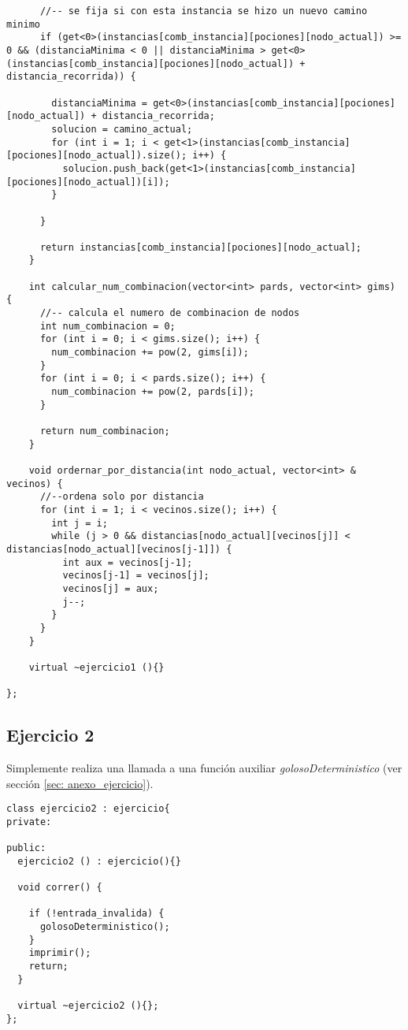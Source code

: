\begin{lstlisting}
      //-- se fija si con esta instancia se hizo un nuevo camino minimo
      if (get<0>(instancias[comb_instancia][pociones][nodo_actual]) >= 0 && (distanciaMinima < 0 || distanciaMinima > get<0>(instancias[comb_instancia][pociones][nodo_actual]) + distancia_recorrida)) {

        distanciaMinima = get<0>(instancias[comb_instancia][pociones][nodo_actual]) + distancia_recorrida;
        solucion = camino_actual;
        for (int i = 1; i < get<1>(instancias[comb_instancia][pociones][nodo_actual]).size(); i++) {
          solucion.push_back(get<1>(instancias[comb_instancia][pociones][nodo_actual])[i]);
        }

      }

      return instancias[comb_instancia][pociones][nodo_actual];
    }

    int calcular_num_combinacion(vector<int> pards, vector<int> gims) {
      //-- calcula el numero de combinacion de nodos
      int num_combinacion = 0;
      for (int i = 0; i < gims.size(); i++) {
        num_combinacion += pow(2, gims[i]);
      }
      for (int i = 0; i < pards.size(); i++) {
        num_combinacion += pow(2, pards[i]);
      }
      
      return num_combinacion;
    }

    void ordernar_por_distancia(int nodo_actual, vector<int> & vecinos) {
      //--ordena solo por distancia
      for (int i = 1; i < vecinos.size(); i++) {
        int j = i;
        while (j > 0 && distancias[nodo_actual][vecinos[j]] < distancias[nodo_actual][vecinos[j-1]]) {
          int aux = vecinos[j-1];
          vecinos[j-1] = vecinos[j];
          vecinos[j] = aux;
          j--;
        }
      }
    }

    virtual ~ejercicio1 (){}

};
\end{lstlisting}

\newpage

\subsection{Ejercicio 2}
\label{sec: anexo_ejercicio2}
\par Simplemente realiza una llamada a una función auxiliar \textit{golosoDeterministico} (ver sección \ref{sec: anexo_ejercicio}).
\begin{lstlisting}
class ejercicio2 : ejercicio{
private:

public:
  ejercicio2 () : ejercicio(){}

  void correr() {

    if (!entrada_invalida) {
      golosoDeterministico();
    }
    imprimir();
    return;
  }

  virtual ~ejercicio2 (){};
};
\end{lstlisting}

